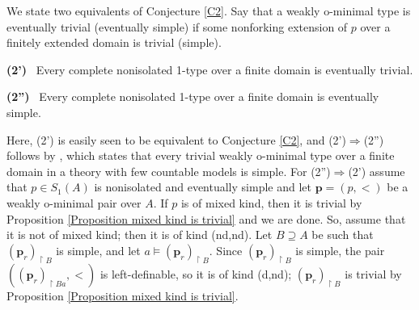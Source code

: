 \documentclass{amsart}
\theoremstyle{definition}
\theoremstyle{definition}
\def\strok{\restriction}
\begin{document}
We state two equivalents of Conjecture \ref{C2}.  
Say that a weakly o-minimal type is eventually trivial (eventually simple) if some nonforking extension of $p$ over a finitely extended domain is trivial (simple).   

\smallskip 
  {\bf (2')} \  Every complete nonisolated 1-type over a finite domain is eventually trivial.  

\smallskip 
 {\bf  (2'')} \ Every complete nonisolated 1-type over a finite domain is eventually simple.  

\medskip
Here, (2') is easily seen to be equivalent to Conjecture \ref{C2}, and (2')$\Rightarrow$(2'') follows by   \cite[Theorem 5.22]{MTwqom1}, which states that every trivial weakly o-minimal type over a finite domain in a theory with few countable models is simple. For (2'')$\Rightarrow$(2')  assume that $p\in S_1(A)$ is nonisolated and eventually simple and let $\mathbf p=(p,<)$ be a weakly o-minimal pair over $A$. If $p$ is of mixed kind, then it is trivial by Proposition \ref{Proposition mixed kind is trivial} and we are done. So, assume that it is not of mixed kind; then it is of kind (nd,nd). 
Let $B\supseteq A$ be such that $(\mathbf p_r)_{\strok B}$ is simple, and let $a\models (\mathbf p_r)_{\strok B}$. Since $(\mathbf p_r)_{\strok B}$ is simple,  the pair $((\mathbf p_r)_{\strok Ba},<)$ is left-definable, so it is of kind (d,nd); $(\mathbf p_r)_{\strok B}$ is trivial by Proposition \ref{Proposition mixed kind is trivial}. 



\printbibliography
\end{document}
